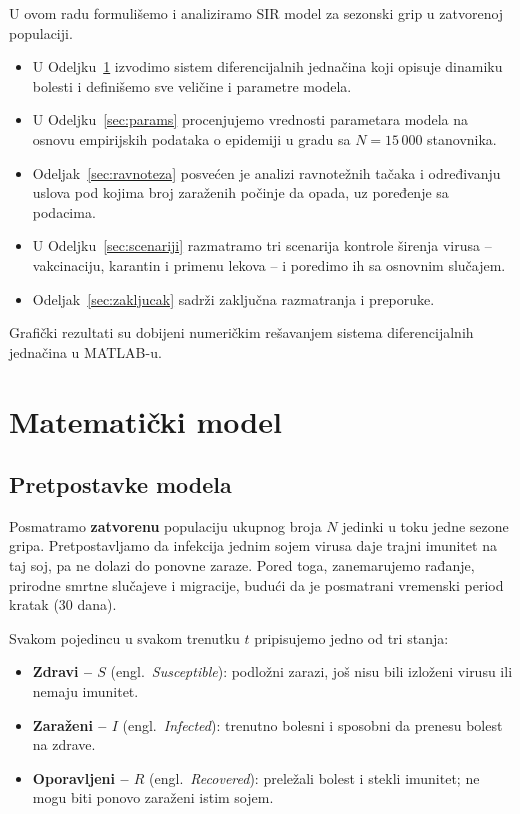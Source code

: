 \documentclass[12pt,a4paper]{article}
\begin{document}
	U ovom radu formulišemo i analiziramo SIR model za sezonski grip u zatvorenoj populaciji.
	\begin{itemize}
		\item U Odeljku~\ref{sec:model} izvodimo sistem diferencijalnih jednačina koji opisuje
		dinamiku bolesti i definišemo sve veličine i parametre modela.
		\item U Odeljku~\ref{sec:params} procenjujemo vrednosti parametara modela na osnovu
		empirijskih podataka o epidemiji u gradu sa $N=15\,000$ stanovnika.
		\item Odeljak~\ref{sec:ravnoteza} posvećen je analizi ravnotežnih tačaka i određivanju
		uslova pod kojima broj zaraženih počinje da opada, uz poređenje sa podacima.
		\item U Odeljku~\ref{sec:scenariji} razmatramo tri scenarija kontrole širenja virusa
		-- vakcinaciju, karantin i primenu lekova -- i poredimo ih sa osnovnim slučajem.
		\item Odeljak~\ref{sec:zakljucak} sadrži zaključna razmatranja i preporuke.
	\end{itemize}
	Grafički rezultati su dobijeni numeričkim rešavanjem sistema diferencijalnih jednačina u
	MATLAB-u.
	
	\section{Matematički model}
	\label{sec:model}
	
	\subsection{Pretpostavke modela}
	
	Posmatramo \textbf{zatvorenu} populaciju ukupnog broja $N$ jedinki u toku jedne sezone gripa.
	Pretpostavljamo da infekcija jednim sojem virusa daje trajni imunitet na taj soj, pa ne dolazi
	do ponovne zaraze. Pored toga, zanemarujemo rađanje, prirodne smrtne slučajeve i migracije,
	budući da je posmatrani vremenski period kratak (30 dana).
	
	Svakom pojedincu u svakom trenutku $t$ pripisujemo jedno od tri stanja:
	\begin{itemize}
		\item \textbf{Zdravi -- $S$} (engl.\ \textit{Susceptible}): podložni zarazi, još nisu bili
		izloženi virusu ili nemaju imunitet.
		\item \textbf{Zaraženi -- $I$} (engl.\ \textit{Infected}): trenutno bolesni i sposobni da
		prenesu bolest na zdrave.
		\item \textbf{Oporavljeni -- $R$} (engl.\ \textit{Recovered}): preležali bolest i stekli
		imunitet; ne mogu biti ponovo zaraženi istim sojem.
	\end{itemize}
	
\end{document}
